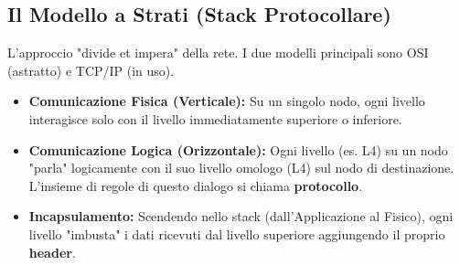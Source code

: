\documentclass[../main.tex]{subfiles}
\begin{document}
\subsection{Il Modello a Strati (Stack Protocollare)}
L'approccio "divide et impera" della rete. I due modelli principali sono OSI (astratto) e TCP/IP (in uso).
\begin{itemize}
    \item \textbf{Comunicazione Fisica (Verticale):} Su un singolo nodo, ogni livello interagisce solo con il livello immediatamente superiore o inferiore.
    \item \textbf{Comunicazione Logica (Orizzontale):} Ogni livello (es. L4) su un nodo "parla" logicamente con il suo livello omologo (L4) sul nodo di destinazione. L'insieme di regole di questo dialogo si chiama \textbf{protocollo}.
    \item \textbf{Incapsulamento:} Scendendo nello stack (dall'Applicazione al Fisico), ogni livello "imbusta" i dati ricevuti dal livello superiore aggiungendo il proprio \textbf{header}.
\end{itemize}
\end{document}
